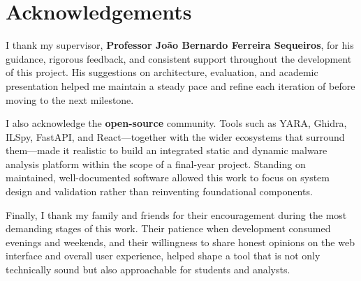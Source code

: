 \chapter*{Acknowledgements}

I thank my supervisor, \textbf{Professor João Bernardo Ferreira Sequeiros}, for his guidance,
rigorous feedback, and consistent support throughout the development of this project. His
suggestions on architecture, evaluation, and academic presentation helped me maintain a steady
pace and refine each iteration of \rat{} before moving to the next milestone.

I also acknowledge the \textbf{open-source} community. Tools such as YARA, Ghidra, ILSpy,
FastAPI, and React---together with the wider ecosystems that surround them---made it realistic
to build an integrated static and dynamic malware analysis platform within the scope of a
final-year project. Standing on maintained, well-documented software allowed this work to focus
on system design and validation rather than reinventing foundational components.

Finally, I thank my family and friends for their encouragement during the most demanding stages
of this work. Their patience when development consumed evenings and weekends, and their willingness
to share honest opinions on the web interface and overall user experience, helped shape a tool
that is not only technically sound but also approachable for students and analysts.
